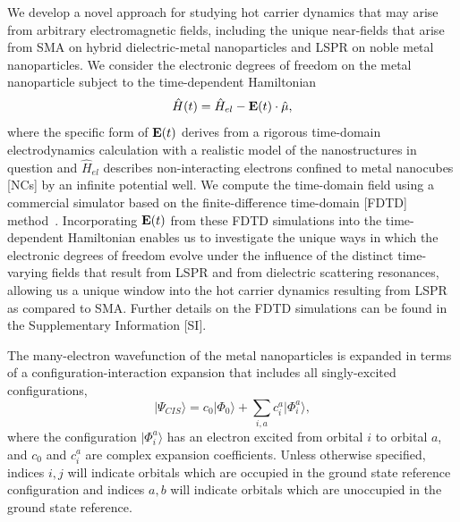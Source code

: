 \documentclass[journal=jpclcd,manuscript=article]{achemso}
\begin{document}
We develop a novel approach for studying hot carrier dynamics that may arise from arbitrary electromagnetic
fields, including the unique near-fields that arise from SMA on hybrid dielectric-metal nanoparticles and LSPR
on noble metal nanoparticles.  %
We consider the electronic degrees of freedom on the metal nanoparticle subject to the time-dependent Hamiltonian 
\begin{equation}\label{eq:TDHam}
\hat{H}(t) = \hat{H}_{el} - {\bf E}(t) \cdot \hat{\mu}, 
\end{equation}
where the specific form of ${\bf E}(t)$ derives from a rigorous time-domain electrodynamics calculation with a realistic model
of the nanostructures in question and $\hat{H}_{el}$ describes non-interacting electrons confined to metal nanocubes [NCs] by an infinite potential well.  
We compute the time-domain field 
using a commercial simulator based on the finite-difference time-domain [FDTD] method~\cite{Lumerical}.  
Incorporating  ${\bf E}(t)$ from these FDTD simulations into the time-dependent Hamiltonian enables us to investigate the unique ways
in which the electronic degrees of freedom evolve under the influence of the distinct time-varying fields that result
from LSPR and from dielectric scattering resonances, allowing us a unique window into the hot carrier dynamics resulting from LSPR as compared
to SMA.  Further details on the FDTD simulations can be found in the Supplementary Information [SI]. 

The many-electron wavefunction of the metal nanoparticles is expanded in terms of a configuration-interaction expansion that
includes all singly-excited configurations,
\begin{equation}\label{eq:CIS}
|\Psi_{CIS}\rangle = c_0 |\Phi_0 \rangle + \sum_{i,a} c_i^a |\Phi_i^a\rangle,
\end{equation}
where the configuration $|\Phi_i^a\rangle$ has an electron excited from orbital $i$ to orbital $a$, 
and $c_0$ and $c_i^a$ are complex expansion coefficients.  Unless otherwise specified, indices $i, j$ will indicate
orbitals which are occupied in the ground state reference configuration and indices $a, b$ will indicate orbitals
which are unoccupied in the ground state reference.  
\end{document}
